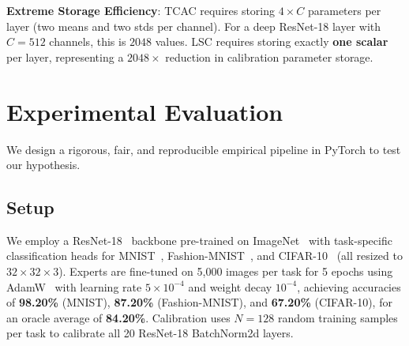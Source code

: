 \documentclass{article}
\theoremstyle{plain}
\theoremstyle{definition}
\theoremstyle{remark}
\begin{document}
\textbf{Extreme Storage Efficiency}: TCAC requires storing $4 \times C$ parameters per layer (two means and two stds per channel). For a deep ResNet-18 layer with $C=512$ channels, this is $2048$ values. LSC requires storing exactly \textbf{one scalar} per layer, representing a $2048\times$ reduction in calibration parameter storage.

\section{Experimental Evaluation}
\label{sec:experiments}

We design a rigorous, fair, and reproducible empirical pipeline in PyTorch to test our hypothesis.

\subsection{Setup}
We employ a ResNet-18~\cite{he2016deep} backbone pre-trained on ImageNet~\cite{deng2009imagenet} with task-specific classification heads for MNIST~\cite{lecun1998gradient}, Fashion-MNIST~\cite{xiao2017fashion}, and CIFAR-10~\cite{krizhevsky2009learning} (all resized to $32 \times 32 \times 3$). Experts are fine-tuned on 5,000 images per task for 5 epochs using AdamW~\cite{loshchilov2017decoupled} with learning rate $5 \times 10^{-4}$ and weight decay $10^{-4}$, achieving accuracies of \textbf{98.20\%} (MNIST), \textbf{87.20\%} (Fashion-MNIST), and \textbf{67.20\%} (CIFAR-10), for an oracle average of \textbf{84.20\%}. Calibration uses $N=128$ random training samples per task to calibrate all 20 ResNet-18 BatchNorm2d layers.
\end{document}
